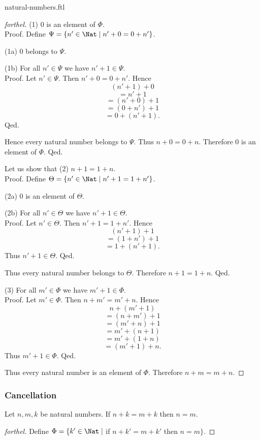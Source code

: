 \documentclass{naproche-library}
\begin{document}
\begin{smodule}{natural-numbers.ftl}
\begin{proof}[forthel]
    (1) $0$ is an element of $\Phi$. \\
    Proof.
      Define $\Psi = \{ n' \in \Nat \mid n' + 0 = 0 + n' \}$.

      (1a) $0$ belongs to $\Psi$.

      (1b) For all $n' \in \Psi$ we have $n' + 1 \in \Psi$. \\
      Proof.
        Let $n' \in \Psi$.
        Then $n' + 0 = 0 + n'$.
        Hence
        \[  (n' + 1) + 0        \]
        \[    = n' + 1          \]
        \[    = (n' + 0) + 1    \]
        \[    = (0 + n') + 1    \]
        \[    = 0 + (n' + 1).   \]
      Qed.

      Hence every natural number belongs to $\Psi$.
      Thus $n + 0 = 0 + n$.
      Therefore $0$ is an element of $\Phi$.
    Qed.

    Let us show that (2) $n + 1 = 1 + n$. \\
    Proof.
      Define $\Theta = \{ n' \in \Nat \mid n' + 1 = 1 + n' \}$.

      (2a) $0$ is an element of $\Theta$.

      (2b) For all $n' \in \Theta$ we have $n' + 1 \in \Theta$. \\
      Proof.
        Let $n' \in \Theta$.
        Then $n' + 1 = 1 + n'$.
        Hence
        \[  (n' + 1) + 1        \]
        \[    = (1 + n') + 1    \]
        \[    = 1 + (n' + 1).   \]
        Thus $n' + 1 \in \Theta$.
      Qed.

      Thus every natural number belongs to $\Theta$.
      Therefore $n + 1 = 1 + n$.
    Qed.

    (3) For all $m' \in \Phi$ we have $m' + 1 \in \Phi$. \\
    Proof.
      Let $m' \in \Phi$.
      Then $n + m' = m' + n$.
      Hence
      \[  n + (m'  + 1)       \]
      \[    = (n + m') + 1    \]
      \[    = (m' + n) + 1    \]
      \[    = m' + (n + 1)    \]
      \[    = m' + (1 + n)    \]
      \[    = (m' + 1) + n.   \]
      Thus $m' + 1 \in \Phi$.
    Qed.

    Thus every natural number is an element of $\Phi$.
    Therefore $n + m = m + n$.
  \end{proof}


  \subsubsection*{Cancellation}

  \begin{proposition}[forthel,id=ARITHMETIC_03_3137702874578944,printid]
    Let $n, m, k$ be natural numbers.
    If $n + k = m + k$ then $n = m$.
  \end{proposition}
  \begin{proof}[forthel]
    Define $\Phi = \{ k' \in \Nat \mid$ if $n + k' = m + k'$ then $n = m \}$.


\end{proof}
\end{smodule}
\end{document}
